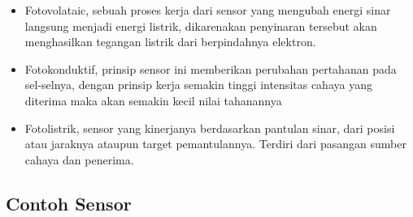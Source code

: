 	\begin{itemize}
	\item Fotovolataic, sebuah proses kerja dari sensor yang mengubah energi sinar langsung menjadi energi listrik, dikarenakan penyinaran tersebut akan menghasilkan tegangan listrik dari berpindahnya elektron.
	\item Fotokonduktif, prinsip sensor ini memberikan perubahan pertahanan pada sel-selnya, dengan prinsip kerja semakin tinggi intensitas cahaya yang diterima maka akan semakin kecil nilai tahanannya
	\item Fotolistrik, sensor yang kinerjanya berdasarkan pantulan sinar, dari posisi atau jaraknya ataupun target pemantulannya. Terdiri dari pasangan sumber cahaya dan penerima.
	\end {itemize}

\subsection{Contoh Sensor}
